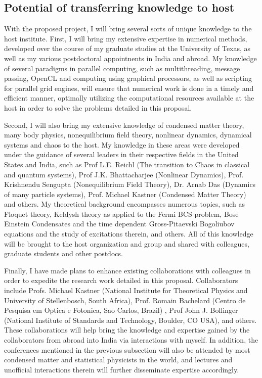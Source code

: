 \documentclass[a4paper,11pt,color]{article}
\begin{document}
\subsection{Potential of transferring knowledge to  host}
\label{sec:training_relevance}
With the proposed project, I will bring several sorts of unique knowledge to the host institute. First, I will bring my extensive expertise in numerical methods, developed over the course of my graduate studies at the University of Texas, as well as my various postdoctoral appointnents in India and abroad.  My knowledge of several paradigms in parallel computing, such as multithreading, message passing, OpenCL and computing using graphical processors, as well as scripting for parallel grid engines, will ensure that numerical work is done in a timely and efficient manner, optimally utilizing the computational resources available at the host in order to solve the problems detailed in this proposal.

Second, I will also bring my extensive knowledge of condensed matter theory, many body physics, nonequilibrium field theory, nonlinear dynamics, dynamical systems and chaos to the host. My knowledge in these areas were developed under the guidance of several leaders in their respective fields in the United States and India, such as Prof L.E. Reichl (The transition to Chaos in classical and quantum systems), Prof J.K. Bhattacharjee (Nonlinear Dynamics), Prof. Krishnendu Sengupta (Nonequilibrium Field Theory), Dr. Arnab Das (Dynamics of many particle systems), Prof. Michael Kastner (Condensed Matter Theory) and others. My theoretical background encompasses numerous topics, such as  Floquet theory, Keldysh theory as applied to the Fermi BCS problem, Bose Einstein Condensates and the time dependent Gross-Pitaevski Bogoliubov equations and the study of excitations therein, and others. All of this knowledge will be brought to the host organization and group and shared with colleagues, graduate students and other postdocs.

Finally, I have made plans to enhance existing collaborations with colleagues in order to expedite the research work detailed in this proposal. Collaborators include  Profs. Michael Kastner  (National Institute for Theoretical Physics and University of Stellenbosch, South Africa), Prof. Romain Bachelard (Centro de Pesquisa em Optica e Fotonica, Sao Carlos, Brazil)  , Prof  John J. Bollinger (National Institute of Standards and Technology, Boulder, CO USA), and others. These collaborations will help bring the knowledge and expertise gained by the collaborators from abroad into India via interactions with myself. In addition, the conferences  mentioned in the previous subsection will also be attended by most condensed matter and statistical physicists in the world, and lectures and unofficial interactions therein will further disseminate expertise accordingly.
\end{document}
